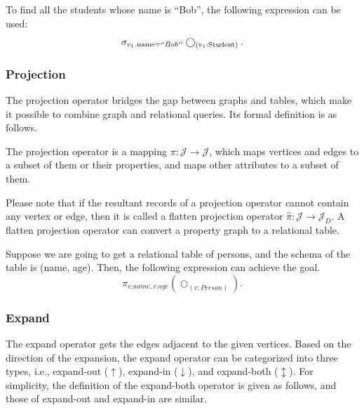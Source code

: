 \begin{example}
    To find all the students whose name is ``Bob'', the following expression can be used:
    \begin{equation*}
        \sigma_{v_1.\text{name} = ``Bob''}\bigcirc_{(v_1\text{:Student})}.
    \end{equation*}
\end{example}

\subsubsection{Projection}
The projection operator bridges the gap between graphs and tables, which make it possible to combine graph and relational queries.
Its formal definition is as follows.

\begin{definition}
    The projection operator is a mapping $\pi : \mathcal{J} \rightarrow \mathcal{J}$, which maps vertices and edges to a subset of them or their properties, and maps other attributes to a subset of them.
\end{definition}

Please note that if the resultant records of a projection operator cannot contain any vertex or edge, then it is called a flatten projection operator $\hat{\pi} : \mathcal{J} \rightarrow \mathcal{J}_D$.
A flatten projection operator can convert a property graph to a relational table.

\begin{example}
    Suppose we are going to get a relational table of persons, and the schema of the table is (name, age).
    Then, the following expression can achieve the goal.
    \begin{equation*}
        \pi_{v.name, v.age}(\bigcirc_{(v:Person)}).
    \end{equation*}
\end{example}

\subsubsection{Expand}

The expand operator gets the edges adjacent to the given vertices.
Based on the direction of the expansion, the expand operator can be categorized into three types, i.e., expand-out ($\uparrow$), expand-in ($\downarrow$), and expand-both ($\updownarrow$).
For simplicity, the definition of the expand-both operator is given as follows, and those of expand-out and expand-in are similar.

